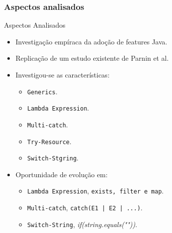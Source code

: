 \documentclass[]{beamer}
\begin{document}
		
	\begin{frame}[label=AspectosAnalisados]
		\frametitle{Aspectos analisados}
		\begin{block}{Aspectos Analisados}
			\begin{itemize}
				\item Investigação empíraca da adoção de features Java.
				
				\item Replicação de um estudo existente de Parnin et al.
				
				\item Investigou-se as características:
					\begin{itemize}
						\item \texttt{Generics}.
						\item \texttt{Lambda Expression}.
						\item \texttt{Multi-catch}.
						\item \texttt{Try-Resource}.
						\item \texttt{Switch-Stgring}.
					\end{itemize}

				\item Oportunidade de evolução em:
					\begin{itemize}
						\item \texttt{Lambda Expression}, \texttt{exists, filter e map}.
						\item \texttt{Multi-catch}, \texttt{catch(E1 | E2 | ...)}.
						\item \texttt{Switch-String}, \textit{if(string.equals(""))}.
					\end{itemize}

			\end{itemize}
		\end{block}
	\end{frame}
	

	

	
%			
\end{document}
